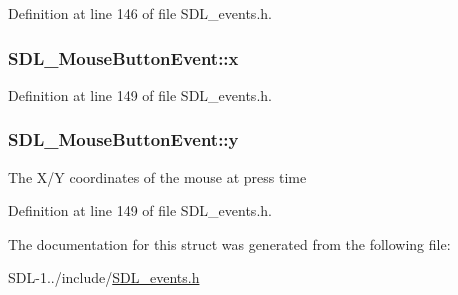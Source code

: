 Definition at line 146 of file S\+D\+L\+\_\+events.\+h.

\hypertarget{struct_s_d_l___mouse_button_event_a6956f6083abfbcc0052f9483fa1c5ffd}{}
\subsubsection[{x}]{ S\+D\+L\+\_\+\+Mouse\+Button\+Event\+::x}\label{struct_s_d_l___mouse_button_event_a6956f6083abfbcc0052f9483fa1c5ffd}


Definition at line 149 of file S\+D\+L\+\_\+events.\+h.

\hypertarget{struct_s_d_l___mouse_button_event_ae22a30e4b491a0cac67dd72d22fdbf80}{}
\subsubsection[{y}]{ S\+D\+L\+\_\+\+Mouse\+Button\+Event\+::y}\label{struct_s_d_l___mouse_button_event_ae22a30e4b491a0cac67dd72d22fdbf80}
The X/\+Y coordinates of the mouse at press time 

Definition at line 149 of file S\+D\+L\+\_\+events.\+h.



The documentation for this struct was generated from the following file\+:\begin{DoxyCompactItemize}
\item 
S\+D\+L-\/1../include/\hyperlink{_s_d_l__events_8h}{S\+D\+L\+\_\+events.\+h}\end{DoxyCompactItemize}
